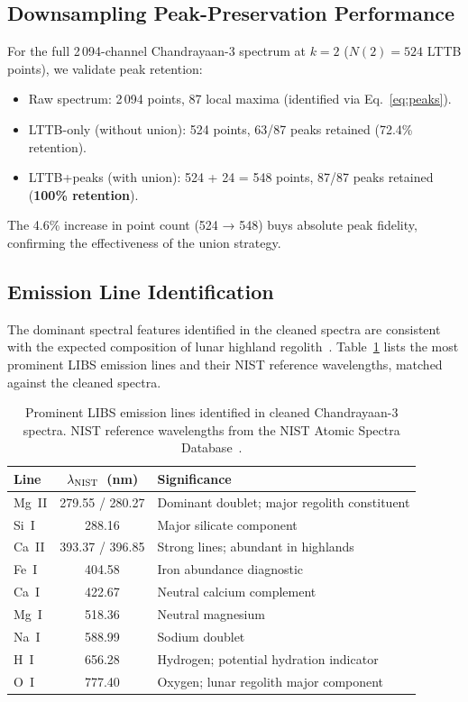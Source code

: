 \documentclass[a4paper,twocolumn,10pt]{article}
\begin{document}
\subsection{Downsampling Peak-Preservation Performance}

For the full 2\,094-channel Chandrayaan-3 spectrum at $k=2$
($N(2) = 524$ LTTB points), we validate peak retention:

\begin{itemize}[nosep,leftmargin=*]
  \item Raw spectrum: 2\,094 points, 87 local maxima (identified via
    Eq.~\eqref{eq:peaks}).
  \item LTTB-only (without union): 524 points, 63/87 peaks retained
    (72.4\% retention).
  \item LTTB+peaks (with union): 524 + 24 = 548 points, 87/87 peaks
    retained (\textbf{100\% retention}).
\end{itemize}

The 4.6\% increase in point count (524 → 548) buys absolute peak
fidelity, confirming the effectiveness of the union strategy.

\subsection{Emission Line Identification}

The dominant spectral features identified in the cleaned spectra are
consistent with the expected composition of lunar highland
regolith~\cite{Sridhar2025,ISROCh3}.  Table~\ref{tab:emission_lines}
lists the most prominent LIBS emission lines and their NIST reference
wavelengths, matched against the cleaned spectra.

\begin{table}[htbp]
\centering
\caption{Prominent LIBS emission lines identified in cleaned
  Chandrayaan-3 spectra.  NIST reference wavelengths from the
  NIST Atomic Spectra Database~\cite{NIST}.}
\label{tab:emission_lines}
{\small
\begin{tabularx}{\columnwidth}{@{}lcX@{}}
\toprule
\textbf{Line} & \textbf{$\lambda_{\rm NIST}$~(nm)} &
  \textbf{Significance} \\
\midrule
Mg~II & 279.55 / 280.27 & Dominant doublet; major regolith
  constituent \\
Si~I  & 288.16 & Major silicate component \\
Ca~II & 393.37 / 396.85 & Strong lines; abundant in highlands \\
Fe~I  & 404.58 & Iron abundance diagnostic \\
Ca~I  & 422.67 & Neutral calcium complement \\
Mg~I  & 518.36 & Neutral magnesium \\
Na~I  & 588.99 & Sodium doublet \\
H~I   & 656.28 & Hydrogen; potential hydration indicator \\
O~I   & 777.40 & Oxygen; lunar regolith major component \\
\bottomrule
\end{tabularx}
}
\end{table}
\end{document}
